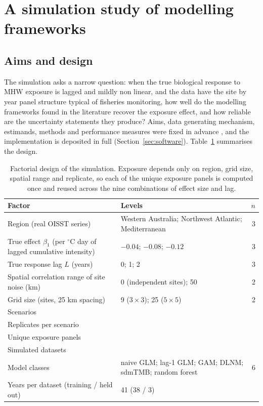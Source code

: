\section{A simulation study of modelling frameworks}\label{sec:simulation}

\subsection{Aims and design}\label{sec:simdesign}

The simulation asks a narrow question: when the true biological response to MHW exposure is lagged and mildly non linear, and the data have the site by year panel structure typical of fisheries monitoring, how well do the modelling frameworks found in the literature recover the exposure effect, and how reliable are the uncertainty statements they produce? Aims, data generating mechanism, estimands, methods and performance measures were fixed in advance \citep{morrisgao2021}, and the implementation is deposited in full (Section~\ref{sec:software}). Table~\ref{tab:design} summarises the design.

\begin{table}[H]
\centering
\caption{Factorial design of the simulation. Exposure depends only on region, grid size, spatial range and replicate, so each of the \nPanels{} unique exposure panels is computed once and reused across the nine combinations of effect size and lag.}
\label{tab:design}
\small
\begin{tabular}{p{6.6cm}p{7.2cm}r}
\toprule
Factor & Levels & $n$ \\
\midrule
Region (real OISST series) & Western Australia; Northwest Atlantic; Mediterranean & 3 \\
True effect $\beta_1$ (per $^{\circ}$C day of lagged cumulative intensity) & $-0.04$; $-0.08$; $-0.12$ & 3 \\
True response lag $L$ (years) & 0; 1; 2 & 3 \\
Spatial correlation range of site noise (km) & 0 (independent sites); 50 & 2 \\
Grid size (sites, 25 km spacing) & 9 ($3 \times 3$); 25 ($5 \times 5$) & 2 \\
\midrule
Scenarios & & \nScenarios{} \\
Replicates per scenario & & \nReplicates{} \\
Unique exposure panels & & \nPanels{} \\
Simulated datasets & & \nDatasets{} \\
Model classes & naive GLM; lag-1 GLM; GAM; DLNM; sdmTMB; random forest & 6 \\
Years per dataset (training / held out) & 41 (38 / 3) & \\
\bottomrule
\end{tabular}
\end{table}

